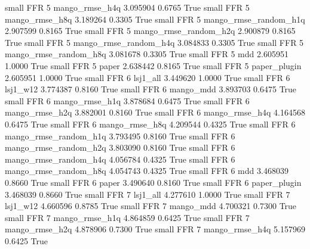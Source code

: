      small      FFR                 5        mango_rmse_h4q   3.095904      0.6765    True
     small      FFR                 5        mango_rmse_h8q   3.189264      0.3305    True
     small      FFR                 5 mango_rmse_random_h1q   2.907599      0.8165    True
     small      FFR                 5 mango_rmse_random_h2q   2.900879      0.8165    True
     small      FFR                 5 mango_rmse_random_h4q   3.084833      0.3305    True
     small      FFR                 5 mango_rmse_random_h8q   3.081678      0.3305    True
     small      FFR                 5                   mdd   2.605951      1.0000    True
     small      FFR                 5                 paper   2.638442      0.8165    True
     small      FFR                 5          paper_plugin   2.605951      1.0000    True
     small      FFR                 6              lsj1_all   3.449620      1.0000    True
     small      FFR                 6              lsj1_w12   3.774387      0.8160    True
     small      FFR                 6             mango_mdd   3.893703      0.6475    True
     small      FFR                 6        mango_rmse_h1q   3.878684      0.6475    True
     small      FFR                 6        mango_rmse_h2q   3.882001      0.8160    True
     small      FFR                 6        mango_rmse_h4q   4.164568      0.6475    True
     small      FFR                 6        mango_rmse_h8q   4.209544      0.4325    True
     small      FFR                 6 mango_rmse_random_h1q   3.793495      0.8160    True
     small      FFR                 6 mango_rmse_random_h2q   3.803090      0.8160    True
     small      FFR                 6 mango_rmse_random_h4q   4.056784      0.4325    True
     small      FFR                 6 mango_rmse_random_h8q   4.054743      0.4325    True
     small      FFR                 6                   mdd   3.468039      0.8660    True
     small      FFR                 6                 paper   3.490640      0.8160    True
     small      FFR                 6          paper_plugin   3.468039      0.8660    True
     small      FFR                 7              lsj1_all   4.277610      1.0000    True
     small      FFR                 7              lsj1_w12   4.660596      0.8785    True
     small      FFR                 7             mango_mdd   4.700321      0.7300    True
     small      FFR                 7        mango_rmse_h1q   4.864859      0.6425    True
     small      FFR                 7        mango_rmse_h2q   4.878906      0.7300    True
     small      FFR                 7        mango_rmse_h4q   5.157969      0.6425    True
